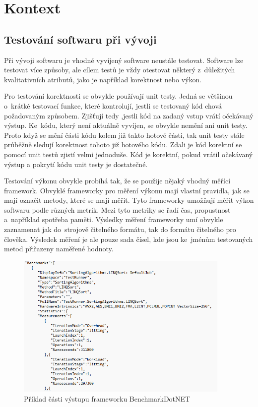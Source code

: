 \chapter{Kontext}

\section{Testování softwaru při vývoji}
Při vývoji softwaru je vhodné vyvíjený software neustále testovat. Software lze testovat
více způsoby, ale cílem testů je vždy otestovat některý z~důležitých kvalitativních
atributů, jako je například korektnost nebo výkon.

Pro testování korektnosti se obvykle používají unit testy. Jedná se většinou o~krátké testovací
funkce, které kontrolují, jestli se testovaný kód chová požadovaným způsobem. Zjišťují tedy ,jestli
kód na zadaný vstup vrátí očekávaný výstup. Ke~kódu, který není aktuálně vyvíjen, se obvykle nemění
ani unit testy.  Proto když se mění části kódu kolem již takto hotové části, tak unit testy stále průběžně sledují
korektnost tohoto již hotového kódu. Zdali je kód korektní se pomocí unit testů zjistí velmi jednoduše.
Kód je korektní, pokud vrátil očekávaný výstup a pokrytí kódu unit testy je dostatečné.

Testování výkonu obvykle probíhá tak, že se použije nějaký vhodný měřící framework.
Obvyklé frameworky pro měření výkonu mají vlastní pravidla, jak se mají označit metody, které
se mají měřit. Tyto frameworky umožňují měřit výkon softwaru podle různých metrik. Mezi tyto metriky
se řadí čas, propustnost a~například spotřeba paměti. Výsledky měření frameworky umí obvykle zaznamenat jak do~strojově
čitelného formátu, tak do formátu čitelného pro člověka. Výsledek měření je ale pouze sada čísel, kde
jsou ke~jménům testovaných metod přiřazeny naměřené hodnoty.

\begin{figure}[!ht]
    \centering
    \includegraphics[width=0.92\textwidth]{../img/BenchmarkDotNET-json.png}
    \caption{Příklad části výstupu frameworku BenchmarkDotNET}
\end{figure}

